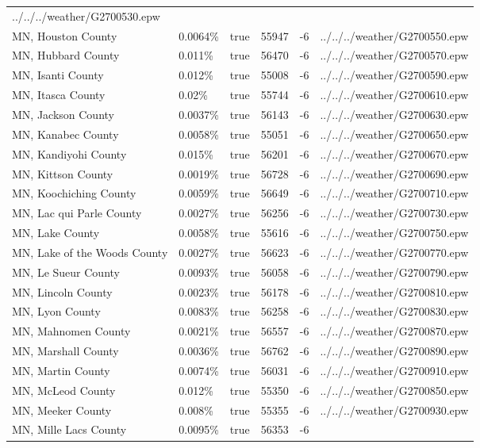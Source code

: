 \begin{longtable}[]{@{}llllll@{}}
../../../weather/G2700530.epw \\
MN, Houston County & 0.0064\% & true & 55947 & -6 &
../../../weather/G2700550.epw \\
MN, Hubbard County & 0.011\% & true & 56470 & -6 &
../../../weather/G2700570.epw \\
MN, Isanti County & 0.012\% & true & 55008 & -6 &
../../../weather/G2700590.epw \\
MN, Itasca County & 0.02\% & true & 55744 & -6 &
../../../weather/G2700610.epw \\
MN, Jackson County & 0.0037\% & true & 56143 & -6 &
../../../weather/G2700630.epw \\
MN, Kanabec County & 0.0058\% & true & 55051 & -6 &
../../../weather/G2700650.epw \\
MN, Kandiyohi County & 0.015\% & true & 56201 & -6 &
../../../weather/G2700670.epw \\
MN, Kittson County & 0.0019\% & true & 56728 & -6 &
../../../weather/G2700690.epw \\
MN, Koochiching County & 0.0059\% & true & 56649 & -6 &
../../../weather/G2700710.epw \\
MN, Lac qui Parle County & 0.0027\% & true & 56256 & -6 &
../../../weather/G2700730.epw \\
MN, Lake County & 0.0058\% & true & 55616 & -6 &
../../../weather/G2700750.epw \\
MN, Lake of the Woods County & 0.0027\% & true & 56623 & -6 &
../../../weather/G2700770.epw \\
MN, Le Sueur County & 0.0093\% & true & 56058 & -6 &
../../../weather/G2700790.epw \\
MN, Lincoln County & 0.0023\% & true & 56178 & -6 &
../../../weather/G2700810.epw \\
MN, Lyon County & 0.0083\% & true & 56258 & -6 &
../../../weather/G2700830.epw \\
MN, Mahnomen County & 0.0021\% & true & 56557 & -6 &
../../../weather/G2700870.epw \\
MN, Marshall County & 0.0036\% & true & 56762 & -6 &
../../../weather/G2700890.epw \\
MN, Martin County & 0.0074\% & true & 56031 & -6 &
../../../weather/G2700910.epw \\
MN, McLeod County & 0.012\% & true & 55350 & -6 &
../../../weather/G2700850.epw \\
MN, Meeker County & 0.008\% & true & 55355 & -6 &
../../../weather/G2700930.epw \\
MN, Mille Lacs County & 0.0095\% & true & 56353 & -6 &

\end{longtable}
